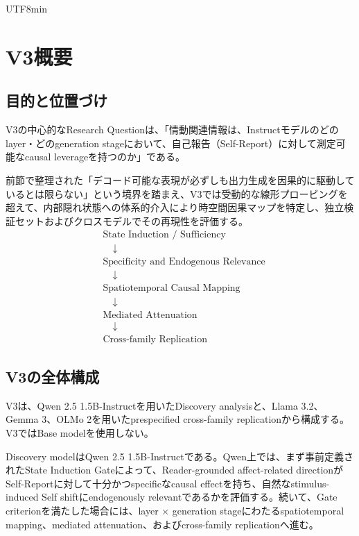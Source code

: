 \documentclass{article} %
\begin{document}
\begin{CJK*}{UTF8}{min}
\section{V3概要}
\label{app:v3-methods}

\subsection{目的と位置づけ}

V3の中心的なResearch Questionは、「情動関連情報は、Instructモデルのどのlayer・どのgeneration stageにおいて、自己報告（Self-Report）に対して測定可能なcausal leverageを持つのか」である。

前節で整理された「デコード可能な表現が必ずしも出力生成を因果的に駆動しているとは限らない」という境界を踏まえ、V3では受動的な線形プロービングを超えて、内部隠れ状態への体系的介入により時空間因果マップを特定し、独立検証セットおよびクロスモデルでその再現性を評価する。
\[
\begin{aligned}
&\text{State Induction / Sufficiency}\\
&\quad\downarrow\\
&\text{Specificity and Endogenous Relevance}\\
&\quad\downarrow\\
&\text{Spatiotemporal Causal Mapping}\\
&\quad\downarrow\\
&\text{Mediated Attenuation}\\
&\quad\downarrow\\
&\text{Cross-family Replication}
\end{aligned}
\]


\subsection{V3の全体構成}

V3は、Qwen 2.5 1.5B-Instructを用いたDiscovery analysisと、Llama 3.2、Gemma 3、OLMo 2を用いたprespecified cross-family replicationから構成する。V3ではBase modelを使用しない。

Discovery modelはQwen 2.5 1.5B-Instructである。Qwen上では、まず事前定義されたState Induction Gateによって、Reader-grounded affect-related directionがSelf-Reportに対して十分かつspecificなcausal effectを持ち、自然なstimulus-induced Self shiftにendogenously relevantであるかを評価する。続いて、Gate criterionを満たした場合には、layer $\times$ generation stageにわたるspatiotemporal mapping、mediated attenuation、およびcross-family replicationへ進む。


\end{CJK*}
\end{document}
